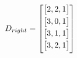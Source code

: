 \documentclass{article}
\begin{document}
\begin{center}
\begin{minipage}{0.2\textwidth}
            $$D_{right} = 
        \begin{bmatrix}
        \vspace{1mm}
         \begin{bmatrix}
         2,2,1 \\ 
         \end{bmatrix} \\
        \vspace{1mm}
         \begin{bmatrix}
         3,0,1 \\
         \end{bmatrix} \\
        \vspace{1mm}
         \begin{bmatrix}
         3,1,1 \\
         \end{bmatrix} \\
        \vspace{1mm}
         \begin{bmatrix}
         3,2,1 \\
        \end{bmatrix} \\
         \end{bmatrix}
        $$
\end{minipage}\quad
\end{center}
\end{document}
